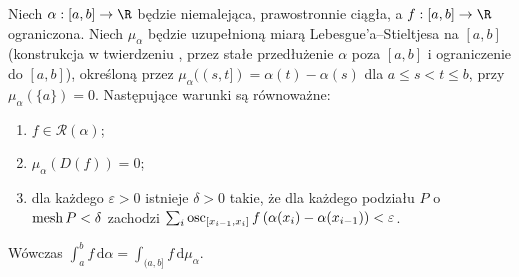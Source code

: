 \begin{twierdzenie}\label{it:thm:rs-oscillation}
Niech $\alpha:[a,b]\to\R$ będzie niemalejąca, prawostronnie ciągła, a $f:[a,b]\to\R$ ograniczona. Niech $\mu_\alpha$ będzie uzupełnioną miarą Lebesgue'a--Stieltjesa na $[a,b]$ (konstrukcja w twierdzeniu , przez stałe przedłużenie $\alpha$ poza $[a,b]$ i ograniczenie do $[a,b]$), określoną przez $\mu_\alpha((s,t])=\alpha(t)-\alpha(s)$ dla $a\le s<t\le b$, przy $\mu_\alpha(\{a\})=0$. Następujące warunki są równoważne:
\begin{enumerate}[label=(\roman*)]
\item $f\in\mathcal R(\alpha)$;
\item $\mu_\alpha(D(f))=0$;
\item dla każdego $\varepsilon>0$ istnieje $\delta>0$ takie, że dla każdego podziału $P$ o $\operatorname{mesh} P<\delta$ zachodzi $\sum_i\operatorname{osc}_{[x_{i-1},x_i]}f\,(\alpha(x_i)-\alpha(x_{i-1}))<\varepsilon$.
\end{enumerate}
Wówczas $\int_a^b f\,\mathrm d\alpha=\int_{(a,b]}f\,\mathrm d\mu_\alpha$.
\end{twierdzenie}
